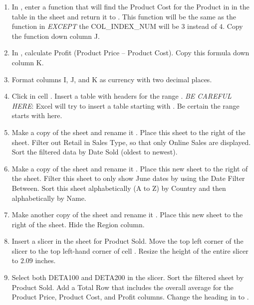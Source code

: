 \begin{enumerate}[resume]
	\item In  , enter a  function that will find the Product Cost for the Product in  in the table in the  sheet and return it to . This  function will be the same as the  function in  \textit{EXCEPT} the COL\_INDEX\_NUM will be $ 3 $ instead of $ 4 $. Copy the function down column J.
	\item In , calculate Profit (Product Price – Product Cost). Copy this formula down column K.
	\item Format columns I, J, and K as currency with two decimal places.
	\item Click in cell . Insert a table with headers for the range . \textit{BE CAREFUL HERE}: Excel will try to insert a table starting with . Be certain the range starts with  here.
	\item Make a copy of the  sheet and rename it . Place this sheet to the right of the  sheet. Filter out Retail in Sales Type, so that only Online Sales are displayed. Sort the filtered data by Date Sold (oldest to newest).
	\item Make a copy of the  sheet and rename it . Place this new sheet to the right of the  sheet. Filter this sheet to only show June dates by using the Date Filter Between. Sort this sheet alphabetically (A to Z) by Country and then alphabetically by Name.
	\item Make another copy of the  sheet and rename it . Place this new sheet to the right of the  sheet. Hide the Region column.
	\item Insert a slicer in the  sheet for Product Sold. Move the top left corner of the slicer to the top left-hand corner of cell . Resize the height of the entire slicer to $ 2.09 $ inches.
	\item Select both DETA100 and DETA200 in the slicer. Sort the filtered sheet by Product Sold. Add a Total Row that includes the overall average for the Product Price, Product Cost, and Profit columns. Change the heading in  to .

\end{enumerate}
